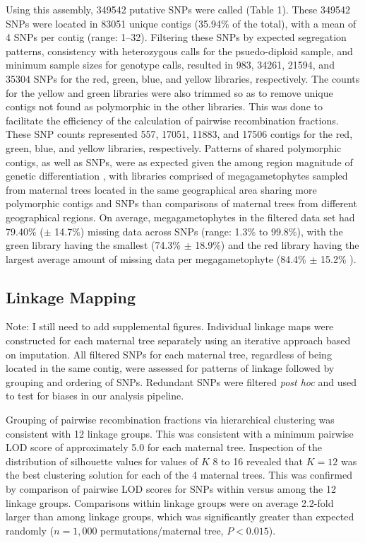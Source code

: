 \documentclass[11pt]{article}
\begin{document}
Using this assembly, \num{349542} putative SNPs were called (Table 1). These  \num{349542} SNPs were located in
\num{83051} unique contigs (35.94\% of the total), with a mean of \num{4} SNPs per contig (range: \SIrange{1}{32}{}). Filtering these SNPs by
expected segregation patterns, consistency with heterozygous calls for the psuedo-diploid sample, and minimum
sample sizes for genotype calls, resulted in \num{983}, \num{34261}, \num{21594}, and \num{35304} SNPs for the red, green, blue, 
and yellow libraries, respectively. The counts for the yellow and green libraries were also trimmed so as to remove
unique contigs not found as polymorphic in the other libraries. This was done to facilitate the efficiency of the calculation of pairwise
recombination fractions. These SNP counts represented \num{557}, \num{17051}, \num{11883}, and \num{17506} contigs
for the red, green, blue, and yellow libraries, respectively. Patterns of shared polymorphic contigs, as well as
SNPs, were as expected given the among region magnitude of genetic differentiation \citep[Figure 2, see][]{Eckert:2008}, 
with libraries comprised of megagametophytes sampled from maternal trees located in 
the same geographical area sharing more polymorphic contigs and SNPs than comparisons of maternal trees from different
geographical regions. On average, megagametophytes in the filtered data set had 79.40\% ($\pm$ 14.7\%) missing data 
across SNPs (range: 1.3\% to 99.8\%), with the green library having the smallest (74.3\% $\pm$ 18.9\%) and the red library having
the largest average amount of missing data per megagametophyte (84.4\% $\pm$ 15.2\% ).

\subsection*{Linkage Mapping}
{Note: I still need to add supplemental figures}.
Individual linkage maps were constructed for each maternal tree separately using an iterative approach
based on imputation. All filtered SNPs for each maternal tree, regardless of being located in the same contig,
were assessed for patterns of linkage followed by grouping and ordering of SNPs. Redundant SNPs were filtered
\textit{post hoc} and used to test for biases in our analysis pipeline.

Grouping of pairwise recombination fractions via hierarchical clustering was consistent with \num{12} linkage groups. 
This was consistent with a minimum pairwise LOD score of approximately 5.0 for each maternal tree.
Inspection of the distribution of silhouette values for values of $K$ \num{8} to \num{16} revealed that $K = 12$ was the best 
clustering solution for each of the \num{4} maternal trees. This was confirmed by comparison of pairwise LOD scores 
for SNPs within versus among the \num{12} linkage groups. Comparisons within linkage groups were on average 2.2-fold larger
than among linkage groups, which was significantly greater than expected randomly ($n = 1,000$
permutations/maternal tree, $P < 0.015$). 
\end{document}
